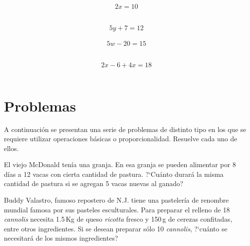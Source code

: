 \documentclass[11pt]{article}
\renewcommand{\theequation}{\fbox{\textbf{\arabic{equation}}}} %
\begin{document}
\begin{multicols}{2}

\begin{equation}    2x = 10     \end{equation}\\
\vspace{1.5cm}

\begin{equation}    5y + 7 = 12     \end{equation}\\

\begin{equation}    5w - 20 = 15     \end{equation}\\
\vspace{1.5cm}

\begin{equation}    2x -6 + 4x = 18     \end{equation}\\

\end{multicols}

\section{Problemas}

A continuaci\'on se presentan una serie de problemas de distinto tipo en los que se requiere utilizar operaciones b\'asicas o proporcionalidad. Resuelve cada uno de ellos.\\
\setcounter{equation}{0}


\noindent \theequation \hspace{4mm}
El viejo McDonald ten\'ia una granja. En esa granja se pueden alimentar por 8 d\'ias a 12 vacas con cierta cantidad de pastura. ?`Cu\'anto durar\'a la misma cantidad de pastura si se agregan 5 vacas nuevas al ganado?

\vspace{5cm}

\noindent \theequation \hspace{4mm}
Buddy Valastro, famoso repostero de N.J. tiene una pasteler\'ia de renombre mundial famosa por sus pasteles esculturales. Para preparar el relleno de  18 \emph{cannolis} necesita 1.5\,Kg de queso \emph{ricotta} fresco y 150\,g de cerezas confitadas, entre otros ingredientes. Si se desean preparar s\'olo 10 \emph{cannolis}, ?`cu\'anto se necesitar\'a de los mismos ingredientes?
\end{document}
